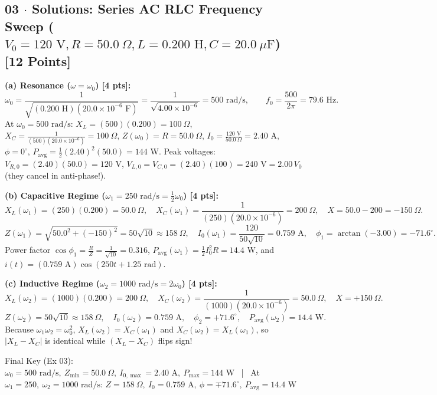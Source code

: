 \documentclass[10pt,letterpaper]{article}
\begin{document}
{\newpage



\subsection*{03 $\cdot$ Solutions: Series AC RLC Frequency Sweep ($V_0=120\text{ V}, R=50.0\ \Omega, L=0.200\text{ H}, C=20.0\ \mu\text{F}$) \hfill [12 Points]}


  \textbf{(a) Resonance ($\omega = \omega_0$) [4 pts]:}
  $$\omega_0 = \frac{1}{\sqrt{(0.200\text{ H})(20.0\times 10^{-6}\text{ F})}} = \frac{1}{\sqrt{4.00\times 10^{-6}}} = 500\text{ rad/s}, \qquad f_0 = \frac{500}{2\pi} = 79.6\text{ Hz}.$$
  At $\omega_0 = 500\text{ rad/s}$: $X_L = (500)(0.200) = 100\ \Omega$, $X_C = \frac{1}{(500)(20.0\times 10^{-6})} = 100\ \Omega$, $Z(\omega_0) = R = 50.0\ \Omega$, $I_0 = \frac{120\text{ V}}{50.0\ \Omega} = 2.40\text{ A}$, $\phi = 0^\circ$, $P_{\text{avg}} = \frac{1}{2}(2.40)^2(50.0) = 144\text{ W}$. Peak voltages: $V_{R,0} = (2.40)(50.0) = 120\text{ V}$, $V_{L,0} = V_{C,0} = (2.40)(100) = 240\text{ V} = 2.00\,V_0$ (they cancel in anti-phase!).

  \textbf{(b) Capacitive Regime ($\omega_1 = 250\text{ rad/s} = \frac{1}{2}\omega_0$) [4 pts]:}
  $$X_L(\omega_1) = (250)(0.200) = 50.0\ \Omega, \quad X_C(\omega_1) = \frac{1}{(250)(20.0\times 10^{-6})} = 200\ \Omega, \quad X = 50.0 - 200 = -150\ \Omega.$$
  $$Z(\omega_1) = \sqrt{50.0^2 + (-150)^2} = 50\sqrt{10} \approx 158\ \Omega, \quad I_0(\omega_1) = \frac{120}{50\sqrt{10}} = 0.759\text{ A}, \quad \phi_1 = \arctan(-3.00) = -71.6^\circ.$$
  Power factor $\cos\phi_1 = \frac{R}{Z} = \frac{1}{\sqrt{10}} = 0.316$, $P_{\text{avg}}(\omega_1) = \frac{1}{2}I_0^2 R = 14.4\text{ W}$, and $i(t) = (0.759\text{ A})\cos(250 t + 1.25\text{ rad})$.

  \textbf{(c) Inductive Regime ($\omega_2 = 1000\text{ rad/s} = 2\omega_0$) [4 pts]:}
  $$X_L(\omega_2) = (1000)(0.200) = 200\ \Omega, \quad X_C(\omega_2) = \frac{1}{(1000)(20.0\times 10^{-6})} = 50.0\ \Omega, \quad X = +150\ \Omega.$$
  $$Z(\omega_2) = 50\sqrt{10} \approx 158\ \Omega, \quad I_0(\omega_2) = 0.759\text{ A}, \quad \phi_2 = +71.6^\circ, \quad P_{\text{avg}}(\omega_2) = 14.4\text{ W}.$$
  Because $\omega_1 \omega_2 = \omega_0^2$, $X_L(\omega_2) = X_C(\omega_1)$ and $X_C(\omega_2) = X_L(\omega_1)$, so $|X_L - X_C|$ is identical while $(X_L - X_C)$ flips sign!

Final Key (Ex 03): ~ $\omega_0 = 500\text{ rad/s},\ Z_{\min}=50.0\ \Omega,\ I_{0,\max}=2.40\text{ A},\ P_{\max}=144\text{ W}$ ~|~ At $\omega_1=250,\ \omega_2=1000\text{ rad/s}$: $Z=158\ \Omega,\ I_0=0.759\text{ A},\ \phi=\mp 71.6^\circ,\ P_{\text{avg}}=14.4\text{ W}$

}
\end{document}
